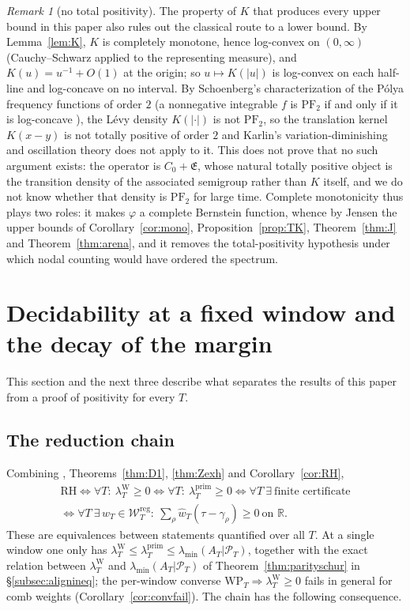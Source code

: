 \documentclass[11pt]{amsart}
\theoremstyle{definition}
\theoremstyle{remark}
\newtheorem{remark}[theorem]{Remark}
\newcommand{\R}{\mathbb R}
\newcommand{\PT}{\mathcal P_T}
\newcommand{\lamP}{\lambda^{\mathrm{prim}}_T}
\newcommand{\lamW}{\lambda^{\mathrm W}_T}
\newcommand{\lamA}{\lambda_{\min}(A_T|\PT)}
\newcommand{\wh}{\widehat w}
\newcommand{\Lev}{\mathfrak E}
\newcommand{\Wcl}{\mathcal W_T}
\begin{document}
\begin{remark}[no total positivity]\label{rem:PF2}
The property of $K$ that produces every upper bound in this paper also rules out the classical
route to a lower bound. By Lemma~\ref{lem:K}, $K$ is completely monotone, hence log-convex on
$(0,\infty)$ (Cauchy--Schwarz applied to the representing measure), and $K(u)=u^{-1}+O(1)$ at the
origin; so $u\mapsto K(|u|)$ is log-convex on each half-line and log-concave on no interval. By
Schoenberg's characterization of the P\'olya frequency functions of order $2$ (a nonnegative
integrable $f$ is $\mathrm{PF}_2$ if and only if it is log-concave \cite{Schoenberg1951}), the L\'evy
density $K(|\cdot|)$ is not $\mathrm{PF}_2$, so the translation kernel $K(x-y)$ is not totally
positive of order $2$ and Karlin's variation-diminishing and oscillation theory
\cite{Karlin1968} does not apply to it. This does not prove that no such argument exists: the
operator is $C_0+\Lev$, whose natural totally positive object is the transition density of the
associated semigroup rather than $K$ itself, and we do not know whether that density is
$\mathrm{PF}_2$ for large time. Complete monotonicity thus plays two roles: it makes $\varphi$ a
complete Bernstein function, whence by Jensen the upper bounds of Corollary~\ref{cor:mono},
Proposition~\ref{prop:TK}, Theorem~\ref{thm:J} and Theorem~\ref{thm:arena}, and it removes the
total-positivity hypothesis under which nodal counting would have ordered the spectrum.
\end{remark}


\section{Decidability at a fixed window and the decay of the margin}\label{sec:path}

This section and the next three describe what separates the results of this paper from a proof of
positivity for every $T$.

\subsection{The reduction chain}
Combining \cite[Thm.~11.3]{Paper45}, Theorems~\ref{thm:D1}, \ref{thm:Zexh} and Corollary~\ref{cor:RH},
\begin{multline*}
\mathrm{RH}\iff\forall T:\ \lamW\ge0\iff\forall T:\ \lamP\ge0\iff\forall T\ \exists\ \text{finite certificate}\\
\iff\forall T\ \exists\,w_T\in\Wcl^{\mathrm{reg}}:\ \sum_\rho\wh_T(\tau-\gamma_\rho)\ge0\ \text{on }\R .
\end{multline*}
These are equivalences between statements quantified over all $T$. At a single window one only has
$\lamW\le\lamP\le\lamA$, together with the exact relation between $\lamW$ and $\lamA$ of
Theorem~\ref{thm:parityschur} in \S\ref{subsec:alignineq}; the per-window converse
$\mathrm{WP}_T\Rightarrow\lamW\ge0$ fails in general for comb weights (Corollary~\ref{cor:convfail}). The chain
has the following consequence.
\end{document}
